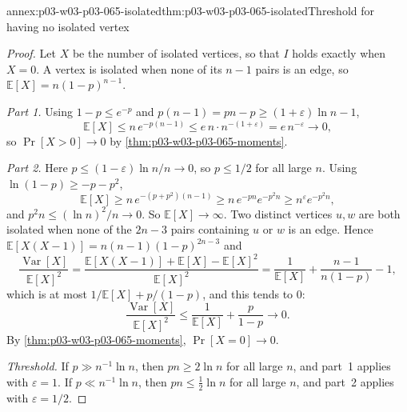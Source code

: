 \begin{annexitem}{annex:p03-w03-p03-065-isolated}{thm:p03-w03-p03-065-isolated}{Threshold for having no isolated vertex}
\begin{proof}
Let \(X\) be the number of isolated vertices, so that \(I\) holds exactly
when \(X=0\).  A vertex is isolated when none of its \(n-1\) pairs is an
edge, so \(\mathbb E[X]=n(1-p)^{n-1}\).

\emph{Part 1.}  Using \(1-p\leq e^{-p}\) and \(p(n-1)=pn-p\geq
(1+\varepsilon)\ln n-1\),
\[
  \mathbb E[X]\leq n\,e^{-p(n-1)}\leq e\,n\cdot n^{-(1+\varepsilon)}
  =e\,n^{-\varepsilon}\to0 ,
\]
so \(\Pr[X>0]\to0\) by \cref{thm:p03-w03-p03-065-moments}.

\emph{Part 2.}  Here \(p\leq(1-\varepsilon)\ln n/n\to0\), so \(p\leq1/2\)
for all large \(n\).  Using \(\ln(1-p)\geq-p-p^2\),
\[
  \mathbb E[X]\geq n\,e^{-(p+p^2)(n-1)}\geq n\,e^{-pn}e^{-p^2n}
  \geq n^{\varepsilon}e^{-p^2n},
\]
and \(p^2n\leq(\ln n)^2/n\to0\).  So \(\mathbb E[X]\to\infty\).  Two
distinct vertices \(u,w\) are both isolated when none of the \(2n-3\) pairs
containing \(u\) or \(w\) is an edge.  Hence
\(\mathbb E[X(X-1)]=n(n-1)(1-p)^{2n-3}\) and
\[
  \frac{\operatorname{Var}[X]}{\mathbb E[X]^2}
  =\frac{\mathbb E[X(X-1)]+\mathbb E[X]-\mathbb E[X]^2}{\mathbb E[X]^2}
  =\frac1{\mathbb E[X]}+\frac{n-1}{n(1-p)}-1 ,
\]
which is at most \(1/\mathbb E[X]+p/(1-p)\), and this tends to \(0\):
\[
  \frac{\operatorname{Var}[X]}{\mathbb E[X]^2}
  \leq\frac1{\mathbb E[X]}+\frac p{1-p}\to0 .
\]
By \cref{thm:p03-w03-p03-065-moments}, \(\Pr[X=0]\to0\).

\emph{Threshold.}  If \(p\gg n^{-1}\ln n\), then \(pn\geq2\ln n\) for all
large \(n\), and part~1 applies with \(\varepsilon=1\).  If
\(p\ll n^{-1}\ln n\), then \(pn\leq\frac12\ln n\) for all large \(n\), and
part~2 applies with \(\varepsilon=1/2\).
\end{proof}
\end{annexitem}

